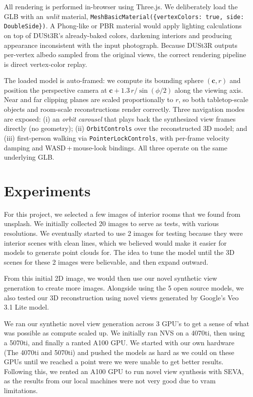 \documentclass{article}
\begin{document}
All rendering is performed in-browser using Three.js. We deliberately
load the GLB with an \emph{unlit} material,
\texttt{MeshBasicMaterial(\{vertexColors: true, side: DoubleSide\})}.
A Phong-like or PBR material would apply lighting calculations on top
of DUSt3R's already-baked colors, darkening interiors and producing
appearance inconsistent with the input photograph. Because DUSt3R
outputs per-vertex albedo sampled from the original views, the correct
rendering pipeline is direct vertex-color replay.

The loaded model is auto-framed: we compute its bounding sphere
$(\mathbf{c}, r)$ and position the perspective camera at
$\mathbf{c} + 1.3\,r / \sin(\phi / 2)$ along the viewing axis. Near and
far clipping planes are scaled proportionally to $r$, so both
tabletop-scale objects and room-scale reconstructions render correctly.
Three navigation modes are exposed: (i) an \emph{orbit carousel} that
plays back the synthesized view frames directly (no geometry);
(ii) \texttt{OrbitControls} over the reconstructed 3D model; and
(iii) first-person walking via \texttt{PointerLockControls}, with
per-frame velocity damping and WASD\,+\,mouse-look bindings. All three
operate on the same underlying GLB.



\section{Experiments}
For this project, we selected a few images of interior rooms that we found from unsplash. We initially collected 20 images to serve as tests, with various resolutions. We eventually started to use 2 images for testing because they were interior scenes with clean lines, which we believed would make it easier for models to generate point clouds for. The idea to tune the model until the 3D scenes for these 2 images were believable, and then expand outward.

From this initial 2D image, we would then use our novel synthetic view generation to create more images. Alongside using the 5 open source models, we also tested our 3D reconstruction using novel views generated by Google's Veo 3.1 Lite model.

We ran our synthetic novel view generation across 3 GPU's to get a sense of what was possible as compute scaled up. We initially ran NVS on a 4070ti, then using a 5070ti, and finally a ranted A100 GPU. We started with our own hardware (The 4070ti and 5070ti) and pushed the models as hard as we could on these GPUs until we reached a point were we were unable to get better results. Following this, we rented an A100 GPU to run novel view synthesis with SEVA, as the results from our local machines were not very good due to vram limitations.
\end{document}

